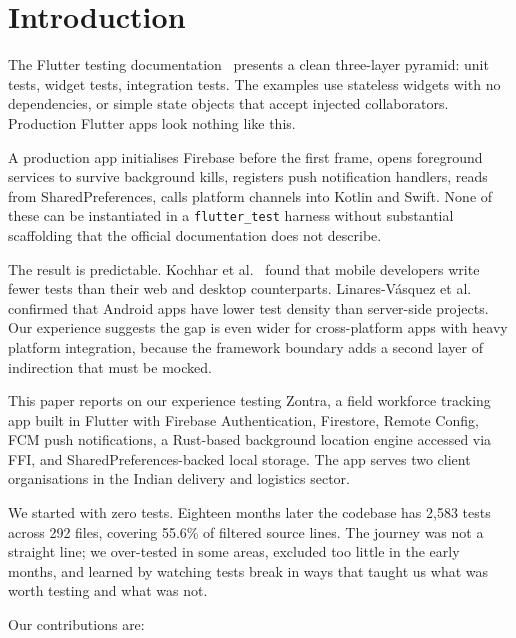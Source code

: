 \documentclass[10pt,journal,compsoc]{IEEEtran}
\begin{document}

\section{Introduction}
\label{sec:intro}

The Flutter testing documentation~\cite{flutter_testing_docs} presents a
clean three-layer pyramid: unit tests, widget tests, integration tests.
The examples use stateless widgets with no dependencies, or simple state
objects that accept injected collaborators. Production Flutter apps look
nothing like this.

A production app initialises Firebase before the first frame, opens
foreground services to survive background kills, registers push
notification handlers, reads from SharedPreferences, calls platform
channels into Kotlin and Swift. None of these can be instantiated in a
\texttt{flutter\_test} harness without substantial scaffolding that the
official documentation does not describe.

The result is predictable. Kochhar et al.~\cite{kochhar2015understanding}
found that mobile developers write fewer tests than their web and desktop
counterparts. Linares-V\'{a}squez et al.~\cite{linares2017developers}
confirmed that Android apps have lower test density than server-side
projects. Our experience suggests the gap is even wider for cross-platform
apps with heavy platform integration, because the framework boundary adds
a second layer of indirection that must be mocked.

This paper reports on our experience testing Zontra, a field workforce
tracking app built in Flutter with Firebase Authentication, Firestore,
Remote Config, FCM push notifications, a Rust-based background location
engine accessed via FFI, and SharedPreferences-backed local storage. The
app serves two client organisations in the Indian delivery and logistics
sector.

We started with zero tests. Eighteen months later the codebase has 2,583
tests across 292 files, covering 55.6\% of filtered source lines. The
journey was not a straight line; we over-tested in some areas, excluded
too little in the early months, and learned by watching tests break in
ways that taught us what was worth testing and what was not.

Our contributions are:
\end{document}
